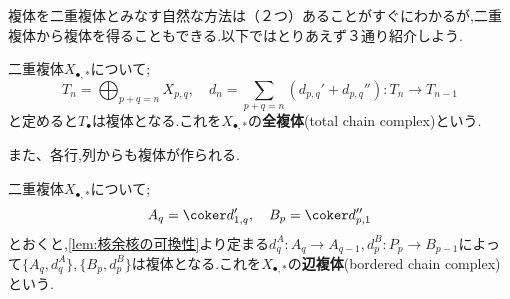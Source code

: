 複体を二重複体とみなす自然な方法は（２つ）あることがすぐにわかるが,二重複体から複体を得ることもできる.以下ではとりあえず３通り紹介しよう.

\begin{defi}[全複体]
	二重複体$X_{\bullet,\ast}$について;
	\[T_n=\bigoplus_{p+q=n} X_{p,q},\quad d_n=\sum_{p+q=n}(d_{p,q}'+d_{p,q}''):T_n\to T_{n-1}\]
	と定めると$T_\bullet$は複体となる.これを$X_{\bullet,\ast}$の\textbf{全複体}(total chain complex)という.
\end{defi}

また、各行,列からも複体が作られる.
\begin{defi}
	二重複体$X_{\bullet,\ast}$について;
	\[A_q=\coker d_{1,q}',\quad B_p=\coker d_{p,1}''\]
	とおくと,\ref{lem:核余核の可換性}より定まる$d_q^A:A_q\to A_{q-1},d_p^B:P_p\to B_{p-1}$によって$\{A_q,d_q^A\},\{B_p,d_p^B\}$は複体となる.これを$X_{\bullet,\ast}$の\textbf{辺複体}(bordered chain complex)という.
\end{defi}

\begin{figure}[H]
	\centering
	\caption{}
\end{figure}

